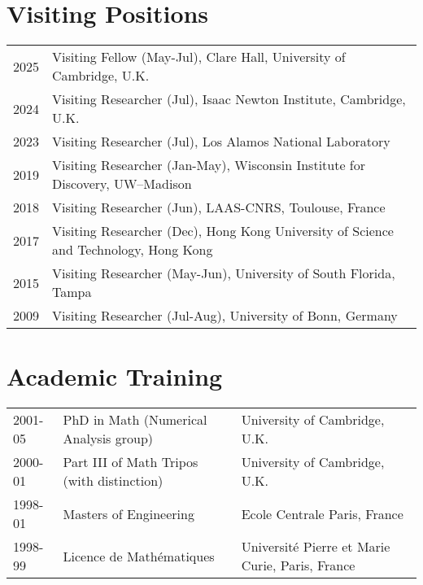 \documentclass[11pt]{article}
\begin{document}
\section{Visiting Positions}
\begin{tabular}{ll}
2025 & Visiting Fellow (May-Jul), Clare Hall, University of Cambridge, U.K.\\ 
2024 & Visiting Researcher (Jul), Isaac Newton Institute, Cambridge, U.K.\\
2023 & Visiting Researcher (Jul), Los Alamos National Laboratory\\
2019 & Visiting Researcher (Jan-May), Wisconsin Institute for Discovery, UW--Madison\\ 
2018 & Visiting Researcher (Jun), LAAS-CNRS, Toulouse, France\\
2017 & Visiting Researcher (Dec), Hong Kong University of Science and Technology, Hong Kong\\
2015 & Visiting Researcher (May-Jun), University of South Florida, Tampa\\
2009 & Visiting Researcher (Jul-Aug), University of Bonn, Germany
\end{tabular}
 



\section{Academic Training}
\begin{tabular}{lll}
2001-05 & PhD in Math (Numerical Analysis group) & University of Cambridge, U.K.\\
2000-01 & Part III of Math Tripos (with distinction) & University of Cambridge, U.K.\\
1998-01 & Masters of Engineering & Ecole Centrale Paris, France\\   
1998-99 & Licence de Math\'{e}matiques & Universit\'{e} Pierre et Marie Curie,  Paris, France\\
\end{tabular}  
\end{document}
